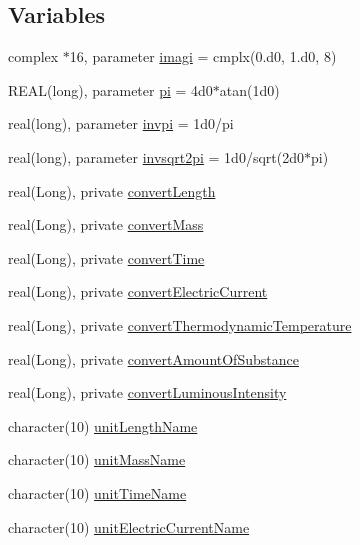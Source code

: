 \subsection*{Variables}
\begin{DoxyCompactItemize}
\item 
complex $\ast$16, parameter \hyperlink{namespacephys__cons_a0dbb22856790b16e206de451e9cdd74a}{imagi} = cmplx(0.d0, 1.d0, 8)
\item 
REAL(long), parameter \hyperlink{namespacephys__cons_aae3c6cb8ae765b0262bb110ff739ba9d}{pi} = 4d0$\ast$atan(1d0)
\item 
real(long), parameter \hyperlink{namespacephys__cons_aa8683f00f4216acc1822dfcb85b1ee00}{invpi} = 1d0/pi
\item 
real(long), parameter \hyperlink{namespacephys__cons_a369d33713444a99a71f80a74c0652d4e}{invsqrt2pi} = 1d0/sqrt(2d0$\ast$pi)
\item 
real(Long), private \hyperlink{namespacephys__cons_a6fe1cfa01be156ac1f0e51e3ab875f21}{convertLength}
\item 
real(Long), private \hyperlink{namespacephys__cons_a48484815d32b74a1735ec19ba407ec5b}{convertMass}
\item 
real(Long), private \hyperlink{namespacephys__cons_af758eccc104b85bbbc1974e3a9095849}{convertTime}
\item 
real(Long), private \hyperlink{namespacephys__cons_a653404efc4f25713af588bb6cad2b39e}{convertElectricCurrent}
\item 
real(Long), private \hyperlink{namespacephys__cons_ae5f9a067db27ea13f6e4028d29900df0}{convertThermodynamicTemperature}
\item 
real(Long), private \hyperlink{namespacephys__cons_a1be0a1da47431668bd2e77c0486f831f}{convertAmountOfSubstance}
\item 
real(Long), private \hyperlink{namespacephys__cons_a64a60f517bd29fbe4a14a5097df961f4}{convertLuminousIntensity}
\item 
character(10) \hyperlink{namespacephys__cons_a54d8616222c422eac2f4ae16a5c3bcba}{unitLengthName}
\item 
character(10) \hyperlink{namespacephys__cons_a424a8036980301898dba6635e916fbf3}{unitMassName}
\item 
character(10) \hyperlink{namespacephys__cons_ab67dd4bef4aa3213b5b9b35ff02d01d9}{unitTimeName}
\item 
character(10) \hyperlink{namespacephys__cons_a90b38082ef08e473377594f1485a86ad}{unitElectricCurrentName}
\item 

\end{DoxyCompactItemize}
